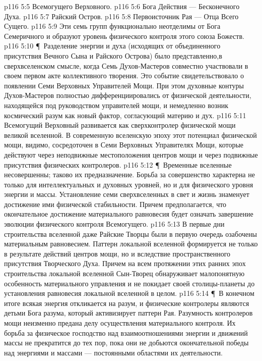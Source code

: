 \vs p116 5:5 \bibnobreakspace Всемогущего Верховного.
\vs p116 5:6 \bibnobreakspace Бога Действия --- Бесконечного Духа.
\vs p116 5:7 \bibnobreakspace Райский Остров.
\vs p116 5:8 \bibnobreakspace Первоисточник Рая --- Отца Всего Сущего.
\vs p116 5:9 Эти семь групп функционально неотделимы от Бога Семеричного и образуют уровень физического контроля этого союза Божеств.
\vs p116 5:10 \P\ Разделение энергии и духа (исходящих от объединенного присутствия Вечного Сына и Райского Острова) было представленно,в сверхвселенском смысле, когда Семь Духов\hyp{}Мастеров совместно участвовали в своем первом акте коллективного творения. Это событие свидетельствовало о появлении Семи Верховных Управителей Мощи. При этом духовные контуры Духов\hyp{}Мастеров полностью дифференциировались от физической деятельности, находящейся под руководством управителей мощи, и немедленно возник космический разум как новый фактор, согласующий материю и дух.
\vs p116 5:11 Всемогущий Верховный развивается как сверхконтролер физической мощи великой вселенной. В современную вселенскую эпоху этот потенциал физической мощи, видимо, сосредоточен в Семи Верховных Управителях Мощи, которые действуют через неподвижные местоположения центров мощи и через подвижные присутствия физических контролеров.
\vs p116 5:12 \P\ Временные вселенные несовершенны; таково их предназначение. Борьба за совершенство характерна не только для интеллектуальных и духовных уровней, но и для физического уровня энергии и массы. Установление семи сверхвселенных в свет и жизнь знаменует достижение ими физической стабильности. Причем предполагается, что окончательное достижение материального равновесия будет означать завершение эволюции физического контроля Всемогущего.
\vs p116 5:13 В первые дни строительства вселенной даже Райские Творцы были в первую очередь озабочены материальным равновесием. Паттерн локальной вселенной формируется не только в результате действий центров мощи, но и вследствие пространственного присутствия Творческого Духа. Причем на всем протяжении этих ранних эпох строительства локальной вселенной Сын\hyp{}Творец обнаруживает малопонятную особенность материального управления и не покидает своей столицы\hyp{}планеты до установления равновесия локальной вселенной в целом.
\vs p116 5:14 \P\ В конечном итоге всякая энергия откликается на разум, и физические контролеры являются детьми Бога разума, который активизирует паттерн Рая. Разумность контролеров мощи неизменно предана делу осуществления материального контроля. Их борьба за физическое господство над взаимоотношениями энергии и движений массы не прекратится до тех пор, пока они не добьются окончательной победы над энергиями и массами --- постоянными областями их деятельности.
